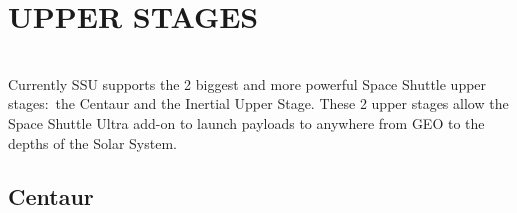 \documentclass[Space_Shuttle_Ultra_Manual.tex]{subfiles}
\begin{document}
\section{UPPER STAGES}
\begin{multicols*}{2}
\label{sec:upper-stages}
\renewcommand{\cfttoctitlefont}{\bf}
\localtableofcontents
\noindent
\\
Currently SSU supports the 2 biggest and more powerful Space Shuttle upper stages$\colon$ the Centaur and the Inertial Upper Stage. These 2 upper stages allow the Space Shuttle Ultra add-on to launch payloads to anywhere from GEO to the depths of the Solar System.
\end{multicols*}

\subsection{Centaur}
\end{document}
